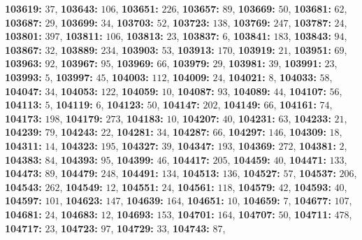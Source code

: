 \textsf{\bfseries 103619:} $37$, \textsf{\bfseries 103643:} $106$, \textsf{\bfseries 103651:} $226$, \textsf{\bfseries 103657:} $89$, \textsf{\bfseries 103669:} $50$, \textsf{\bfseries 103681:} $62$, \textsf{\bfseries 103687:} $29$, \textsf{\bfseries 103699:} $34$, \textsf{\bfseries 103703:} $52$, \textsf{\bfseries 103723:} $138$, \textsf{\bfseries 103769:} $247$, \textsf{\bfseries 103787:} $24$, \textsf{\bfseries 103801:} $397$, \textsf{\bfseries 103811:} $106$, \textsf{\bfseries 103813:} $23$, \textsf{\bfseries 103837:} $6$, \textsf{\bfseries 103841:} $183$, \textsf{\bfseries 103843:} $94$, \textsf{\bfseries 103867:} $32$, \textsf{\bfseries 103889:} $234$, \textsf{\bfseries 103903:} $53$, \textsf{\bfseries 103913:} $170$, \textsf{\bfseries 103919:} $21$, \textsf{\bfseries 103951:} $69$, \textsf{\bfseries 103963:} $92$, \textsf{\bfseries 103967:} $95$, \textsf{\bfseries 103969:} $66$, \textsf{\bfseries 103979:} $29$, \textsf{\bfseries 103981:} $39$, \textsf{\bfseries 103991:} $23$, \textsf{\bfseries 103993:} $5$, \textsf{\bfseries 103997:} $45$, \textsf{\bfseries 104003:} $112$, \textsf{\bfseries 104009:} $24$, \textsf{\bfseries 104021:} $8$, \textsf{\bfseries 104033:} $58$, \textsf{\bfseries 104047:} $34$, \textsf{\bfseries 104053:} $122$, \textsf{\bfseries 104059:} $10$, \textsf{\bfseries 104087:} $93$, \textsf{\bfseries 104089:} $44$, \textsf{\bfseries 104107:} $56$, \textsf{\bfseries 104113:} $5$, \textsf{\bfseries 104119:} $6$, \textsf{\bfseries 104123:} $50$, \textsf{\bfseries 104147:} $202$, \textsf{\bfseries 104149:} $66$, \textsf{\bfseries 104161:} $74$, \textsf{\bfseries 104173:} $198$, \textsf{\bfseries 104179:} $273$, \textsf{\bfseries 104183:} $10$, \textsf{\bfseries 104207:} $40$, \textsf{\bfseries 104231:} $63$, \textsf{\bfseries 104233:} $21$, \textsf{\bfseries 104239:} $79$, \textsf{\bfseries 104243:} $22$, \textsf{\bfseries 104281:} $34$, \textsf{\bfseries 104287:} $66$, \textsf{\bfseries 104297:} $146$, \textsf{\bfseries 104309:} $18$, \textsf{\bfseries 104311:} $14$, \textsf{\bfseries 104323:} $195$, \textsf{\bfseries 104327:} $39$, \textsf{\bfseries 104347:} $193$, \textsf{\bfseries 104369:} $272$, \textsf{\bfseries 104381:} $2$, \textsf{\bfseries 104383:} $84$, \textsf{\bfseries 104393:} $95$, \textsf{\bfseries 104399:} $46$, \textsf{\bfseries 104417:} $205$, \textsf{\bfseries 104459:} $40$, \textsf{\bfseries 104471:} $133$, \textsf{\bfseries 104473:} $89$, \textsf{\bfseries 104479:} $248$, \textsf{\bfseries 104491:} $134$, \textsf{\bfseries 104513:} $136$, \textsf{\bfseries 104527:} $57$, \textsf{\bfseries 104537:} $206$, \textsf{\bfseries 104543:} $262$, \textsf{\bfseries 104549:} $12$, \textsf{\bfseries 104551:} $24$, \textsf{\bfseries 104561:} $118$, \textsf{\bfseries 104579:} $42$, \textsf{\bfseries 104593:} $40$, \textsf{\bfseries 104597:} $101$, \textsf{\bfseries 104623:} $147$, \textsf{\bfseries 104639:} $164$, \textsf{\bfseries 104651:} $10$, \textsf{\bfseries 104659:} $7$, \textsf{\bfseries 104677:} $107$, \textsf{\bfseries 104681:} $24$, \textsf{\bfseries 104683:} $12$, \textsf{\bfseries 104693:} $153$, \textsf{\bfseries 104701:} $164$, \textsf{\bfseries 104707:} $50$, \textsf{\bfseries 104711:} $478$, \textsf{\bfseries 104717:} $23$, \textsf{\bfseries 104723:} $97$, \textsf{\bfseries 104729:} $33$, \textsf{\bfseries 104743:} $87$, 
